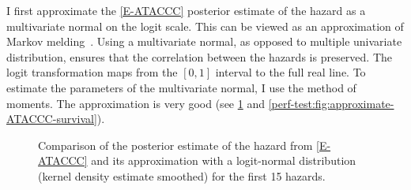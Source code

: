 \documentclass[12pt, letterpaper]{article} %
\begin{document}
I first approximate the \cref{E-ATACCC} posterior estimate of the hazard as a multivariate normal on the logit scale.
This can be viewed as an approximation of Markov melding~\autocite{goudieJoining}.
Using a multivariate normal, as opposed to multiple univariate distribution, ensures that the correlation between the hazards is preserved.
The logit transformation maps from the $[0, 1]$ interval to the full real line.
To estimate the parameters of the multivariate normal, I use the method of moments.
The approximation is very good (see \cref{perf-test:fig:approximate-ATACCC-hazard} and \cref{perf-test:fig:approximate-ATACCC-survival}).
\begin{figure}
  \vspace{-2.5cm}
  \caption[Approximating the ATACCC posterior hazard as a logit-normal]{Comparison of the posterior estimate of the hazard from \cref{E-ATACCC} and its approximation with a logit-normal distribution (kernel density estimate smoothed) for the first 15 hazards. \label{perf-test:fig:approximate-ATACCC-hazard}}
\end{figure}
\end{document}
